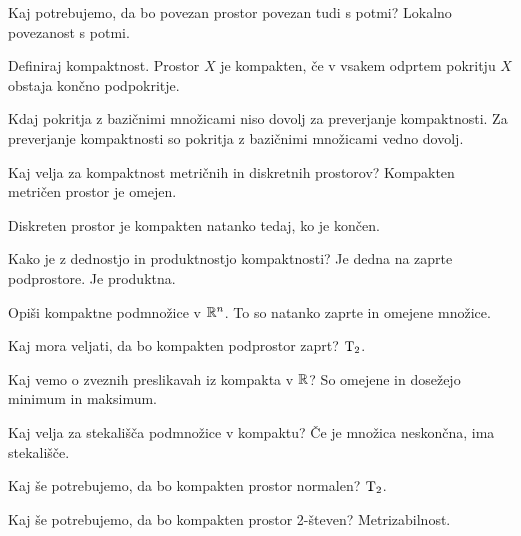 \begin{vo}{Kaj potrebujemo, da bo povezan prostor povezan tudi s potmi?}
  Lokalno povezanost s potmi.
\end{vo}

\begin{vo}{Definiraj kompaktnost.}
  Prostor $X$ je kompakten, če v vsakem odprtem pokritju $X$ obstaja končno podpokritje.
\end{vo}

\begin{vo}{Kdaj pokritja z bazičnimi množicami niso dovolj za preverjanje kompaktnosti.}
  Za preverjanje kompaktnosti so pokritja z bazičnimi množicami vedno dovolj.
\end{vo}

\begin{vo}{Kaj velja za kompaktnost metričnih in diskretnih prostorov?}
  Kompakten metričen prostor je omejen.

  Diskreten prostor je kompakten natanko tedaj, ko je končen.
\end{vo}

\begin{vo}{Kako je z dednostjo in produktnostjo kompaktnosti?}
  Je dedna na zaprte podprostore. Je produktna.
\end{vo}

\begin{vo}{Opiši kompaktne podmnožice v $\mathbb{R}^n$.}
  To so natanko zaprte in omejene množice.
\end{vo}

\begin{vo}{Kaj mora veljati, da bo kompakten podprostor zaprt?}
  $\text{T}_{2}$.
\end{vo}

\begin{vo}{Kaj vemo o zveznih preslikavah iz kompakta v $\mathbb{R}$?}
  So omejene in dosežejo minimum in maksimum.
\end{vo}

\begin{vo}{Kaj velja za stekališča podmnožice v kompaktu?}
  Če je množica neskončna, ima stekališče.
\end{vo}

\begin{vo}{Kaj še potrebujemo, da bo kompakten prostor normalen?}
  $\text{T}_{2}$.
\end{vo}

\begin{vo}{Kaj še potrebujemo, da bo kompakten prostor 2-števen?}
  Metrizabilnost.
\end{vo}

